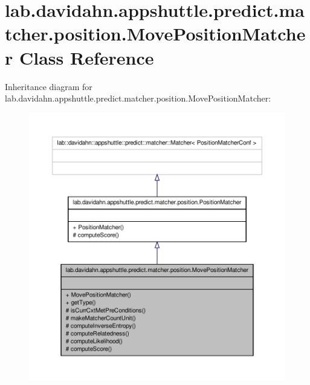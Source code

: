 \hypertarget{classlab_1_1davidahn_1_1appshuttle_1_1predict_1_1matcher_1_1position_1_1_move_position_matcher}{\section{lab.\-davidahn.\-appshuttle.\-predict.\-matcher.\-position.\-Move\-Position\-Matcher \-Class \-Reference}
\label{classlab_1_1davidahn_1_1appshuttle_1_1predict_1_1matcher_1_1position_1_1_move_position_matcher}
}


\-Inheritance diagram for lab.\-davidahn.\-appshuttle.\-predict.\-matcher.\-position.\-Move\-Position\-Matcher\-:
\nopagebreak
\begin{figure}[H]
\begin{center}
\leavevmode
\includegraphics[width=350pt]{classlab_1_1davidahn_1_1appshuttle_1_1predict_1_1matcher_1_1position_1_1_move_position_matcher__inherit__graph}
\end{center}
\end{figure}


